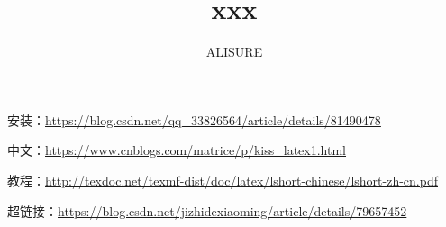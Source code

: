 \documentclass{ctexart}
\begin{document}
	
	\title{xxx}
	\author{ALISURE}
	
	安装：\url{https://blog.csdn.net/qq_33826564/article/details/81490478}
		
	中文：\url{https://www.cnblogs.com/matrice/p/kiss_latex1.html}
		
	教程：\url{http://texdoc.net/texmf-dist/doc/latex/lshort-chinese/lshort-zh-cn.pdf}
	
	超链接：\url{https://blog.csdn.net/jizhidexiaoming/article/details/79657452}
\end{document}
